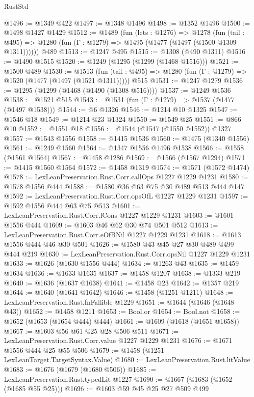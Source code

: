 \begin{lexlean}{RustStd}
\begin{coremodule}
@1496 := @1349 @422
@1497 := @1348 @1496
@1498 := @1352 @1496
@1500 := @1498 @1427 @1429
@1512 := @1489
    (fun (lets : @1276) =>
    @1278
      (fun (tail : @495) => @1280 (fun (Γ : @1279) => @1495 (@1477 (@1497 (@1500 @1309 @1311))))))
    @489
@1513 := @1247 @495
@1515 := @1308 (@490 @1311)
@1516 := @1490 @1515
@1520 := @1249 (@1295 (@1299 (@1468 @1516)))
@1521 := @1500 @489
@1530 := @1513
    (fun (tail : @495) => @1280 (fun (Γ : @1279) => @1520 (@1477 (@1497 (@1521 @1311)))))
    @515
@1531 := @1247 @1279
@1536 := @1295 (@1299 (@1468 (@1490 (@1308 @516))))
@1537 := @1249 @1536
@1538 := @1521 @515
@1543 := @1531 (fun (Γ : @1279) => @1537 (@1477 (@1497 @1538)))
@1544 := @6 @1326
@1546 := @1214 @10 @1325
@1547 := @1546 @18
@1549 := @1214 @23 @1324
@1550 := @1549 @25
@1551 := @866 @10
@1552 := @1551 @18
@1556 := @1544 (@1547 (@1550 @1552)) @1327
@1557 := @1543 @1556
@1558 := @1415 @1536
@1560 := @1475 (@1340 @1556)
@1561 := @1249 @1560
@1564 := @1347 @1556 @1496 @1538
@1566 := @1558 (@1561 @1564)
@1567 := @1458 @1286
@1569 := @1566 (@1567 @1294)
@1571 := @1415 @1560 @1564
@1572 := @1458 @1319
@1574 := @1571 (@1572 @1474)
@1578 := LexLeanPreservation.Rust.Corr.callOps @1227 @1229 @1231
@1580 := @1578 @1556 @444
@1588 := @1580 @36 @63 @75 @30 @489 @513 @444 @147
@1592 := LexLeanPreservation.Rust.Corr.opsOfL @1227 @1229 @1231
@1597 := @1592 @1556 @444 @63 @75 @513
@1601 := LexLeanPreservation.Rust.Corr.lCons @1227 @1229 @1231
@1603 := @1601 @1556 @444
@1609 := @1603 @46 @62 @30 @74 @501 @512
@1613 := LexLeanPreservation.Rust.Corr.eOfBNil @1227 @1229 @1231
@1618 := @1613 @1556 @444 @46 @30 @501
@1626 := @1580 @43 @45 @27 @30 @489 @499 @444 @219
@1630 := LexLeanPreservation.Rust.Corr.opsNil @1227 @1229 @1231
@1633 := @1626 (@1630 @1556 @444)
@1634 := @1263 @43
@1635 := @1459 @1634
@1636 := @1633 @1635
@1637 := @1458 @1207
@1638 := @1333 @219
@1640 := @1636 (@1637 @1638)
@1641 := @1458 @23
@1642 := @1357 @219
@1644 := @1640 (@1641 @1642)
@1646 := @1458 (@1251 @1211)
@1648 := LexLeanPreservation.Rust.fnFallible @1229
@1651 := @1644 (@1646 (@1648 @43))
@1652 := @1458 @1211
@1653 := Bool.or
@1654 := Bool.not
@1658 := @1652 (@1653 (@1654 @444) @444)
@1661 := @1609 (@1618 (@1651 @1658))
@1667 := @1603 @56 @61 @25 @28 @506 @511
@1671 := LexLeanPreservation.Rust.Corr.value @1227 @1229 @1231
@1676 := @1671 @1556 @444 @25 @55 @506
@1679 := @1458 (@1251 LexLeanTarget.TargetSyntax.Value)
@1680 := LexLeanPreservation.Rust.litValue
@1683 := @1676 (@1679 (@1680 @506))
@1685 := LexLeanPreservation.Rust.typedLit @1227
@1690 := @1667 (@1683 (@1652 (@1685 @55 @25)))
@1696 := @1603 @59 @45 @25 @27 @509 @499

\end{coremodule}
\end{lexlean}
